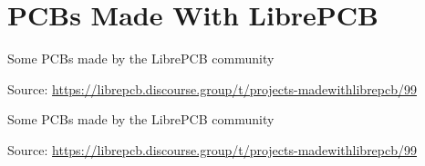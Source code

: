 \section{PCBs Made With LibrePCB}

\begin{frame}{\secname}

  Some PCBs made by the LibrePCB community \faChild\faChild\faChild

  \begin{center}

    \tiny Source:
    \url{https://librepcb.discourse.group/t/projects-madewithlibrepcb/99}
  \end{center}

\end{frame}


\begin{frame}[noframenumbering]{\secname}

  Some PCBs made by the LibrePCB community \faChild\faChild\faChild

  \begin{center}

    \tiny Source:
    \url{https://librepcb.discourse.group/t/projects-madewithlibrepcb/99}
  \end{center}

\end{frame}

